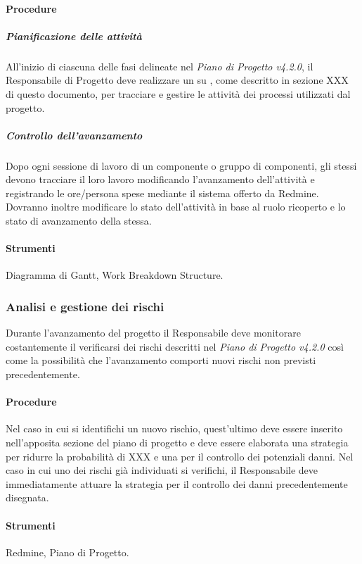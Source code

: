 \paragraph{Procedure}

\subparagraph{Pianificazione delle attività}

All'inizio di ciascuna delle fasi delineate nel \emph{Piano di Progetto v4.2.0}, il Responsabile di Progetto deve realizzare un  su , come descritto in sezione XXX di questo documento, per tracciare e gestire le attività dei processi utilizzati dal progetto.


\subparagraph{Controllo dell'avanzamento}
\label{}
Dopo ogni sessione di lavoro di un componente o gruppo di componenti, gli stessi devono tracciare il loro lavoro modificando l'avanzamento dell'attività e registrando le ore/persona spese mediante il sistema offerto da Redmine.
Dovranno inoltre modificare lo stato dell'attività in base al ruolo ricoperto e lo stato di avanzamento della stessa. 


\paragraph{Strumenti}
Diagramma di Gantt, Work Breakdown Structure.


\subsubsection{Analisi e gestione dei rischi}
Durante l'avanzamento del progetto il Responsabile  deve monitorare costantemente il verificarsi dei rischi descritti nel \emph{Piano di Progetto v4.2.0} così come la possibilità che l'avanzamento comporti nuovi rischi non previsti precedentemente.


\paragraph{Procedure}
Nel caso in cui si identifichi un nuovo rischio, quest'ultimo deve essere inserito nell'apposita sezione del piano di progetto e deve essere elaborata una strategia per ridurre la probabilità di XXX e una per il controllo dei potenziali danni.
Nel caso in cui uno dei rischi già individuati si verifichi, il Responsabile deve immediatamente attuare la strategia per il controllo dei danni precedentemente disegnata.

\paragraph{Strumenti}
Redmine, Piano di Progetto.


